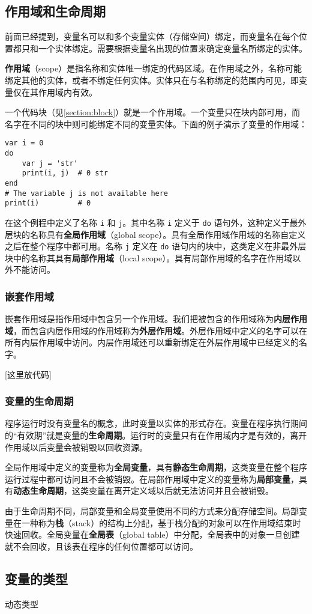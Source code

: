 \subsection{作用域和生命周期} \label{section::scope_life}

前面已经提到，变量名可以和多个变量实体（存储空间）绑定，而变量名在每个位置都只和一个实体绑定。需要根据变量名出现的位置来确定变量名所绑定的实体。

\textbf{作用域}（scope）是指名称和实体唯一绑定的代码区域。在作用域之外，名称可能绑定其他的实体，或者不绑定任何实体。实体只在与名称绑定的范围内可见，即变量仅在其作用域内有效。

一个代码块（见\ref{section:block}）就是一个作用域。一个变量只在块内部可用，而名字在不同的块中则可能绑定不同的变量实体。下面的例子演示了变量的作用域：
\begin{lstlisting}[language=berry]
var i = 0
do
    var j = 'str'
    print(i, j)  # 0 str
end
# The variable j is not available here
print(i)         # 0
\end{lstlisting}
在这个例程中定义了名称 \texttt{i} 和 \texttt{j}。其中名称 \texttt{i} 定义于 \texttt{do} 语句外，这种定义于最外层块的名称具有\textbf{全局作用域}（global scope）。具有全局作用域作用域的名称自定义之后在整个程序中都可用。名称 \texttt{j} 定义在 \texttt{do} 语句内的块中，这类定义在非最外层块中的名称其具有\textbf{局部作用域}（local scope）。具有局部作用域的名字在作用域以外不能访问。

\subsubsection{嵌套作用域}

嵌套作用域是指作用域中包含另一个作用域。我们把被包含的作用域称为\textbf{内层作用域}，而包含内层作用域的作用域称为\textbf{外层作用域}。外层作用域中定义的名字可以在所有内层作用域中访问。内层作用域还可以重新绑定在外层作用域中已经定义的名字。

[这里放代码]

\subsubsection{变量的生命周期}

程序运行时没有变量名的概念，此时变量以实体的形式存在。变量在程序执行期间的``有效期''就是变量的\textbf{生命周期}。运行时的变量只有在作用域内才是有效的，离开作用域以后变量会被销毁以回收资源。

全局作用域中定义的变量称为\textbf{全局变量}，具有\textbf{静态生命周期}，这类变量在整个程序运行过程中都可访问且不会被销毁。在局部作用域中定义的变量称为\textbf{局部变量}，具有\textbf{动态生命周期}，这类变量在离开定义域以后就无法访问并且会被销毁。

由于生命周期不同，局部变量和全局变量使用不同的方式来分配存储空间。局部变量在一种称为\textbf{栈}（stack）的结构上分配，基于栈分配的对象可以在作用域结束时快速回收。全局变量在\textbf{全局表}（global table）中分配，全局表中的对象一旦创建就不会回收，且该表在程序的任何位置都可以访问。

\subsection{变量的类型}

动态类型
